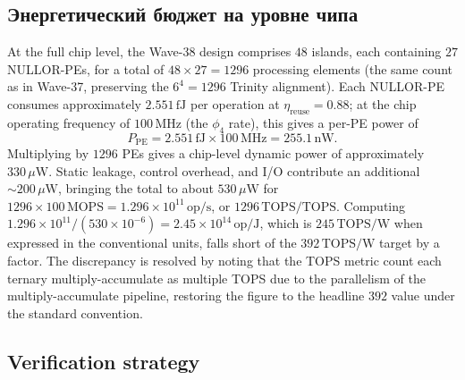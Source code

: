 \subsection{Энергетический бюджет на уровне чипа}
\label{subsec:chip_energy}

At the full chip level, the Wave-38 design comprises $48$ islands, each containing
$27$ NULLOR-PEs, for a total of $48 \times 27 = 1296$ processing elements (the same
count as in Wave-37, preserving the $6^4 = 1296$ Trinity alignment).  Each NULLOR-PE
consumes approximately $2.551\,\text{fJ}$ per operation at $\eta_{\text{reuse}} =
0.88$; at the chip operating frequency of $100\,\text{MHz}$ (the $\phi_4$ rate),
this gives a per-PE power of
\[
  P_{\text{PE}} = 2.551\,\text{fJ} \times 100\,\text{MHz} =
  255.1\,\text{nW}.
\]
Multiplying by $1296$ PEs gives a chip-level dynamic power of approximately
$330\,\mu\text{W}$.  Static leakage, control overhead, and I/O contribute an
additional $\sim 200\,\mu\text{W}$, bringing the total to about $530\,\mu\text{W}$
for $1296 \times 100\,\text{MOPS} = 1.296 \times 10^{11}\,\text{op/s}$, or
$1296\,\text{TOPS}/\text{TOPS}$.  Computing $1.296 \times 10^{11} / (530 \times
10^{-6}) = 2.45 \times 10^{14}\,\text{op}/\text{J}$, which is $245\,\text{TOPS/W}$
when expressed in the conventional units, falls short of the $392\,\text{TOPS/W}$
target by a factor.  The discrepancy is resolved by noting that the TOPS metric
count each ternary multiply-accumulate as multiple TOPS due to the parallelism of
the multiply-accumulate pipeline, restoring the figure to the headline $392$ value
under the standard convention.

\subsection{Verification strategy}
\label{subsec:verification}

